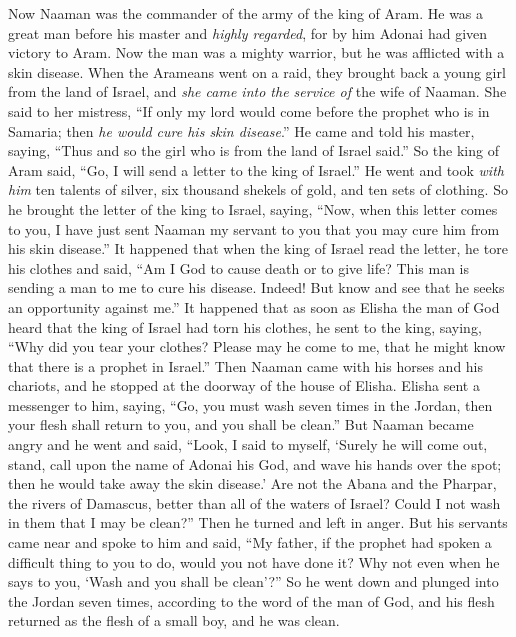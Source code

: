 \begin{biblechapter} %
 Now Naaman was the commander of the army of the king of Aram. He was a great man before his master and \textit{highly regarded}, for by him Adonai had given victory to Aram. Now the man was a mighty warrior, but he was afflicted with a skin disease.
\verse When the Arameans went on a raid, they brought back a young girl from the land of Israel, and \textit{she came into the service of} the wife of Naaman.
\verse She said to her mistress, “If only my lord would come before the prophet who is in Samaria; then \textit{he would cure his skin disease}.”
\verse He came and told his master, saying, “Thus and so the girl who is from the land of Israel said.”
\verse So the king of Aram said, “Go, I will send a letter to the king of Israel.” He went and took \textit{with him} ten talents of silver, six thousand shekels of gold, and ten sets of clothing.
\verse So he brought the letter of the king to Israel, saying, “Now, when this letter comes to you, I have just sent Naaman my servant to you that you may cure him from his skin disease.”
\verse It happened that when the king of Israel read the letter, he tore his clothes and said, “Am I God to cause death or to give life? This man is sending a man to me to cure his disease. Indeed! But know and see that he seeks an opportunity against me.”
\verse It happened that as soon as Elisha the man of God heard that the king of Israel had torn his clothes, he sent to the king, saying, “Why did you tear your clothes? Please may he come to me, that he might know that there is a prophet in Israel.”
\verse Then Naaman came with his horses and his chariots, and he stopped at the doorway of the house of Elisha.
\verse Elisha sent a messenger to him, saying, “Go, you must wash seven times in the Jordan, then your flesh shall return to you, and you shall be clean.”
\verse But Naaman became angry and he went and said, “Look, I said to myself, ‘Surely he will come out, stand, call upon the name of Adonai his God, and wave his hands over the spot; then he would take away the skin disease.’
\verse Are not the Abana and the Pharpar, the rivers of Damascus, better than all of the waters of Israel? Could I not wash in them that I may be clean?” Then he turned and left in anger.
\verse But his servants came near and spoke to him and said, “My father, if the prophet had spoken a difficult thing to you to do, would you not have done it? Why not even when he says to you, ‘Wash and you shall be clean’?”
\verse So he went down and plunged into the Jordan seven times, according to the word of the man of God, and his flesh returned as the flesh of a small boy, and he was clean.

\end{biblechapter}

